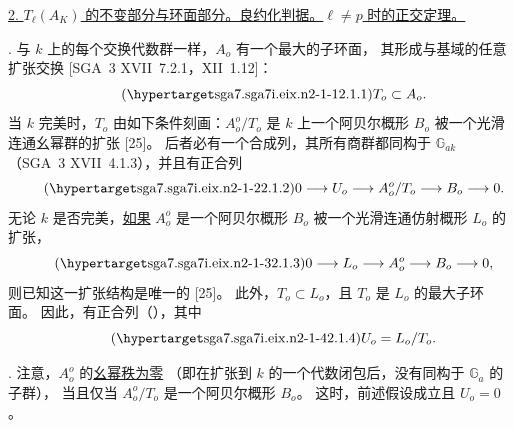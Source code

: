 \medskip
\noindent
\underline{2. $T_\ell(A_K)$ 的不变部分与环面部分。良约化判据。$\ell\ne p$ 时的正交定理。}

\medskip
\noindent
{}. 与 $k$ 上的每个交换代数群一样，$A_o$ 有一个最大的子环面，
其形成与基域的任意扩张交换 [SGA~3 XVII~7.2.1，XII~1.12]：
\begin{equation}\tag{\SGARefTarget{sga7.sga7i.eix.n2-1-1}{2.1.1}}
 T_o\subset A_o.
\end{equation}
当 $k$ 完美时，$T_o$ 由如下条件刻画：$A_o^o/T_o$ 是 $k$ 上一个阿贝尔概形 $B_o$
被一个光滑连通幺幂群的扩张 [25]。
后者必有一个合成列，其所有商群都同构于 $\mathbb G_{ak}$（SGA~3 XVII~4.1.3），并且有正合列
\begin{equation}\tag{\SGARefTarget{sga7.sga7i.eix.n2-1-2}{2.1.2}}
 0\longrightarrow U_o\longrightarrow A_o^o/T_o
 \longrightarrow B_o\longrightarrow0.
\end{equation}
无论 $k$ 是否完美，\underline{如果} $A_o^o$ 是一个阿贝尔概形 $B_o$
被一个光滑连通仿射概形 $L_o$ 的扩张，
\begin{equation}\tag{\SGARefTarget{sga7.sga7i.eix.n2-1-3}{2.1.3}}
 0\longrightarrow L_o\longrightarrow A_o^o
 \longrightarrow B_o\longrightarrow0,
\end{equation}
则已知这一扩张结构是唯一的 [25]。
此外，$T_o\subset L_o$，且 $T_o$ 是 $L_o$ 的最大子环面。
因此，有正合列（），其中
\begin{equation}\tag{\SGARefTarget{sga7.sga7i.eix.n2-1-4}{2.1.4}}
 U_o=L_o/T_o.
\end{equation}

\medskip
\noindent
{}. 注意，$A_o^o$ 的\underline{幺幂秩为零}
（即在扩张到 $k$ 的一个代数闭包后，没有同构于 $\mathbb G_a$ 的子群），
当且仅当 $A_o^o/T_o$ 是一个阿贝尔概形 $B_o$。
这时，前述假设成立且 $U_o=0$。


